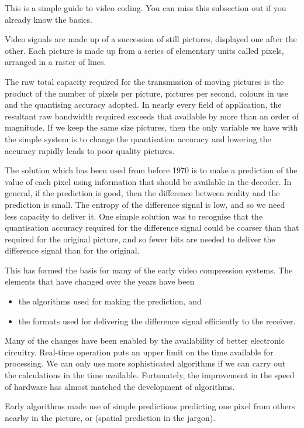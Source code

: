 This is a simple guide to video coding. You can miss this subsection out
if you already know the basics.

Video signals are made up of a succession of still pictures, displayed
one after the other. Each picture is made up from a series of elementary
units called pixels, arranged in a raster of lines.

The raw total capacity required for the transmission of moving pictures
is the product of the number of pixels per picture, pictures per second,
colours in use and the quantising accuracy adopted. In nearly every
field of application, the resultant raw bandwidth required exceeds that
available by more than an order of magnitude.  If we keep the same size
pictures, then the only variable we have with the simple system is to
change the quantisation accuracy and lowering the accuracy rapidly leads
to poor quality pictures.

The solution which has been used from before 1970 is to make a
prediction of the value of each pixel using information that should be
available in the decoder. In general, if the prediction is good, then
the difference between reality and the prediction is small. The entropy
of the difference signal is low, and so we need less capacity to deliver
it. One simple solution was to recognise that the quantisation accuracy
required for the difference signal could be coarser than that required
for the original picture, and so fewer bits are needed to deliver the
difference signal than for the original.

This has formed the basis for many of the early video compression
systems.  The elements that have changed over the years have been

\begin{itemize}
    \item the algorithms used for making the prediction, and
    \item the formats used for delivering the difference signal
    efficiently to the receiver.
\end{itemize}

Many of the changes have been enabled by the availability of better
electronic circuitry. Real-time operation puts an upper limit on the
time available for processing.  We can only use more sophisticated
algorithms if we can carry out the calculations in the time available.
Fortunately, the improvement in the speed of hardware has almost matched
the development of algorithms.

Early algorithms made use of simple predictions predicting one pixel
from others nearby in the picture, or (spatial prediction in the
jargon).


